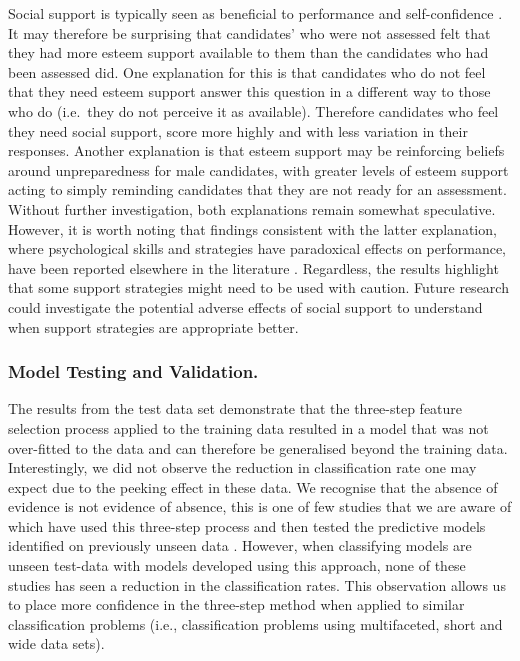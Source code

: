 \documentclass[
  12pt,
  a4paper,
]{book}
\begin{document}
Social support is typically seen as beneficial to performance and self-confidence \citep{Rees2007}. It may therefore be surprising that candidates' who were not assessed felt that they had more esteem support available to them than the candidates who had been assessed did. One explanation for this is that candidates who do not feel that they need esteem support answer this question in a different way to those who do (i.e.~they do not perceive it as available). Therefore candidates who feel they need social support, score more highly and with less variation in their responses. Another explanation is that esteem support may be reinforcing beliefs around unpreparedness for male candidates, with greater levels of esteem support acting to simply reminding candidates that they are not ready for an assessment. Without further investigation, both explanations remain somewhat speculative. However, it is worth noting that findings consistent with the latter explanation, where psychological skills and strategies have paradoxical effects on performance, have been reported elsewhere in the literature \citep{Roberts2013}. Regardless, the results highlight that some support strategies might need to be used with caution. Future research could investigate the potential adverse effects of social support to understand when support strategies are appropriate better.

\hypertarget{model-testing-and-validation.-2}{%
\subsubsection{Model Testing and Validation.}\label{model-testing-and-validation.-2}}

The results from the test data set demonstrate that the three-step feature selection process applied to the training data resulted in a model that was not over-fitted to the data and can therefore be generalised beyond the training data. Interestingly, we did not observe the reduction in classification rate one may expect due to the peeking effect \citep{Kuncheva2018, Reunanen2003a} in these data. We recognise that the absence of evidence is not evidence of absence, this is one of few studies that we are aware of which have used this three-step process and then tested the predictive models identified on previously unseen data \citep[see][]{Jones2019b, Jones2020}. However, when classifying models are unseen test-data with models developed using this approach, none of these studies has seen a reduction in the classification rates. This observation allows us to place more confidence in the three-step method when applied to similar classification problems (i.e., classification problems using multifaceted, short and wide data sets).
\end{document}
